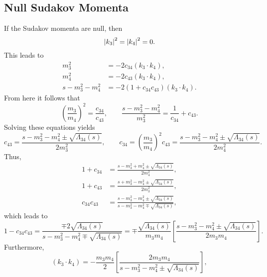 \subsection{Null Sudakov Momenta}
If the Sudakov momenta are null, then
\begin{equation}
	\left\lvert k_{3} \right\rvert^{2} = \left\lvert k_{4} \right\rvert^{2} = 0.
\end{equation}
This leads to
\begin{equation}
\begin{split}
	m_{3}^{2} &= -2 c_{34} \left(k_{3} \cdot k_{4} \right), \\
	m_{4}^{2} &= -2 c_{43} \left(k_{3} \cdot k_{4} \right), \\
	s - m_{3}^{2} - m_{4}^{2} &= -2\left(1 + c_{34}c_{43} \right) \left(k_{3} \cdot k_{4} \right).
\end{split}
\end{equation}
From here it follows that
\begin{equation}
	\left( \frac{m_{3}}{m_{4}} \right)^{2} = \frac{c_{34}}{c_{43}}, \qquad \frac{s - m_{3}^{2} - m_{4}^{2}}{m_{3}^{2}} = \frac{1}{c_{34}} + c_{43}.
\end{equation}
Solving these equations yields
\begin{equation}
	c_{43} = \frac{s - m_{3}^{2} - m_{4}^{2} \pm \sqrt{\Lambda_{34}(s)}}{2 m_{3}^{2}}, \qquad c_{34} = \left( \frac{m_{3}}{m_{4}} \right)^{2} c_{43} = \frac{s - m_{3}^{2} - m_{4}^{2} \pm \sqrt{\Lambda_{34}(s)}}{2 m_{4}^{2}}.
\end{equation}
Thus,
\begin{align}
	1 + c_{34} &= \frac{s - m_{3}^{2} + m_{4}^{2} \pm \sqrt{\Lambda_{34}(s)}}{2 m_{4}^{2}}, \\
	1 + c_{43} &= \frac{s + m_{3}^{2} - m_{4}^{2} \pm \sqrt{\Lambda_{34}(s)}}{2 m_{3}^{2}}, \\
	c_{34} c_{43} &= \frac{s - m_{3}^{2} - m_{4}^{2} \pm \sqrt{\Lambda_{34}(s)}}{s - m_{3}^{2} - m_{4}^{2} \mp \sqrt{\Lambda_{34}(s)}},
\end{align}
which leads to
\begin{equation}
	1 - c_{34} c_{43} = \frac{\mp 2 \sqrt{\Lambda_{34}(s)}}{s - m_{3}^{2} - m_{4}^{2} \mp \sqrt{\Lambda_{34}(s)}} = \mp \frac{\sqrt{\Lambda_{34}(s)}}{m_{3} m_{4}} \left[ \frac{s - m_{3}^{2} - m_{4}^{2} \pm \sqrt{\Lambda_{34}(s)}}{2 m_{3} m_{4}} \right] .
\end{equation}
Furthermore,
\begin{equation}
	\left( k_{3} \cdot k_{4} \right) = - \frac{m_{3} m_{4}}{2} \left[ \frac{2m_{3} m_{4}}{s - m_{3}^{2} - m_{4}^{2} \pm \sqrt{\Lambda_{34}(s)}} \right],
\end{equation}
